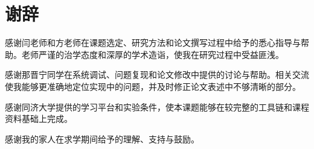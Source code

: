 \chapter*{谢辞}

感谢闫老师和方老师在课题选定、研究方法和论文撰写过程中给予的悉心指导与帮助。老师严谨的治学态度和深厚的学术造诣，使我在研究过程中受益匪浅。

感谢那晋宁同学在系统调试、问题复现和论文修改中提供的讨论与帮助。相关交流使我能够更准确地定位实现中的问题，并及时修正论文表述中不够清晰的部分。

感谢同济大学提供的学习平台和实验条件，使本课题能够在较完整的工具链和课程资料基础上完成。

感谢我的家人在求学期间给予的理解、支持与鼓励。
